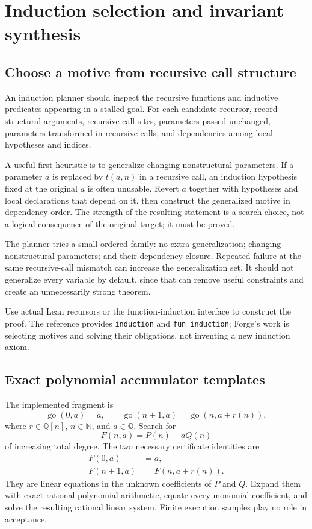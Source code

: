 \documentclass[11pt,a4paper]{article}
\newcommand{\Q}{\mathbb{Q}}
\newcommand{\N}{\mathbb{N}}
\begin{document}
\section{Induction selection and invariant synthesis}
\label{sec:induction}

\subsection{Choose a motive from recursive call structure}

An induction planner should inspect the recursive functions and inductive predicates appearing in a stalled goal. For each candidate recursor, record structural arguments, recursive call sites, parameters passed unchanged, parameters transformed in recursive calls, and dependencies among local hypotheses and indices.

A useful first heuristic is to generalize changing nonstructural parameters. If a parameter $a$ is replaced by $t(a,n)$ in a recursive call, an induction hypothesis fixed at the original $a$ is often unusable. Revert $a$ together with hypotheses and local declarations that depend on it, then construct the generalized motive in dependency order. The strength of the resulting statement is a search choice, not a logical consequence of the original target; it must be proved.

The planner tries a small ordered family: no extra generalization; changing nonstructural parameters; and their dependency closure. Repeated failure at the same recursive-call mismatch can increase the generalization set. It should not generalize every variable by default, since that can remove useful constraints and create an unnecessarily strong theorem.

Use actual Lean recursors or the function-induction interface to construct the proof. The reference provides \texttt{induction} and \texttt{fun\_induction}; Forge's work is selecting motives and solving their obligations, not inventing a new induction axiom.\cite{tactic-reference}

\subsection{Exact polynomial accumulator templates}

The implemented fragment is
\[
\operatorname{go}(0,a)=a,\qquad
\operatorname{go}(n+1,a)=\operatorname{go}(n,a+r(n)),
\]
where $r\in\Q[n]$, $n\in\N$, and $a\in\Q$. Search for
\[
F(n,a)=P(n)+aQ(n)
\]
of increasing total degree. The two necessary certificate identities are
\begin{align}
F(0,a)&=a,\label{eq:base}\\
F(n+1,a)&=F(n,a+r(n)).\label{eq:step}
\end{align}
They are linear equations in the unknown coefficients of $P$ and $Q$. Expand them with exact rational polynomial arithmetic, equate every monomial coefficient, and solve the resulting rational linear system. Finite execution samples play no role in acceptance.
\end{document}
